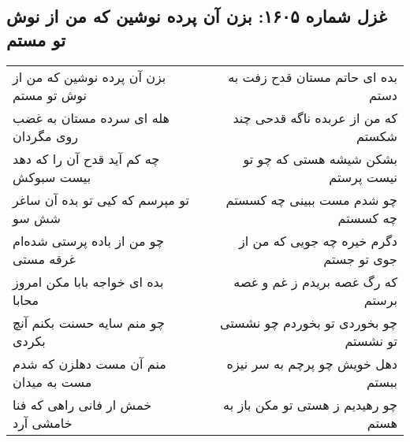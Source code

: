 \begin{center}
\section*{غزل شماره ۱۶۰۵: بزن آن پرده نوشین که من از نوش تو مستم}
\label{sec:1605}
\begin{longtable}{l p{0.5cm} r}
بزن آن پرده نوشین که من از نوش تو مستم
&&
بده ای حاتم مستان قدح زفت به دستم
\\
هله ای سرده مستان به غضب روی مگردان
&&
که من از عربده ناگه قدحی چند شکستم
\\
چه کم آید قدح آن را که دهد بیست سبوکش
&&
بشکن شیشه هستی که چو تو نیست پرستم
\\
تو مپرسم که کیی تو بده آن ساغر شش سو
&&
چو شدم مست ببینی چه کسستم چه کسستم
\\
چو من از باده پرستی شده‌ام غرقه مستی
&&
دگرم خیره چه جویی که من از جوی تو جستم
\\
بده ای خواجه بابا مکن امروز محابا
&&
که رگ غصه بریدم ز غم و غصه برستم
\\
چو منم سایه حسنت بکنم آنچ بکردی
&&
چو بخوردی تو بخوردم چو نشستی تو نشستم
\\
منم آن مست دهلزن که شدم مست به میدان
&&
دهل خویش چو پرچم به سر نیزه ببستم
\\
خمش ار فانی راهی که فنا خامشی آرد
&&
چو رهیدیم ز هستی تو مکن باز به هستم
\\
\end{longtable}
\end{center}
